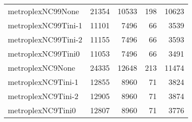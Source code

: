\begin{longtable}{lrrrr}
metroplexNC99None & 21354 & 10533 & 198 & 10623 \\
metroplexNC99Tini-1 & 11101 & 7496 & 66 & 3539 \\
metroplexNC99Tini-2 & 11155 & 7496 & 66 & 3593 \\
metroplexNC99Tini0 & 11053 & 7496 & 66 & 3491 \\
metroplexNC9None & 24335 & 12648 & 213 & 11474 \\
metroplexNC9Tini-1 & 12855 & 8960 & 71 & 3824 \\
metroplexNC9Tini-2 & 12905 & 8960 & 71 & 3874 \\
metroplexNC9Tini0 & 12807 & 8960 & 71 & 3776 \\
\end{longtable}
